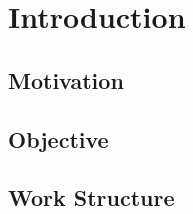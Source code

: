 \chapter{Introduction}

\section{Motivation}


\section{Objective}\label{section:background}

\section{Work Structure}\label{section:structure}
